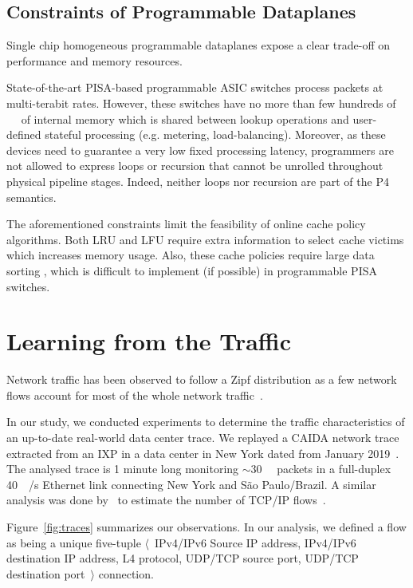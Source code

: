 \subsection{Constraints of Programmable Dataplanes}

Single chip homogeneous programmable dataplanes expose a clear trade-off on performance and memory resources.

State-of-the-art PISA-based programmable ASIC switches process packets at multi-terabit rates.
However, these switches have no more than few hundreds of \SI{}{\mega\byte} of internal memory which is shared between lookup operations and user-defined stateful processing (e.g. metering, load-balancing).
Moreover, as these devices need to guarantee a very low fixed processing latency, programmers are not allowed to express loops or recursion that cannot be unrolled throughout physical pipeline stages.
Indeed, neither loops nor recursion are part of the P4 semantics.

The aforementioned constraints limit the feasibility of online cache policy algorithms.
Both LRU and LFU require extra information to select cache victims which increases memory usage.
Also, these cache policies require large data sorting , which is difficult to implement (if possible) in programmable PISA switches.

\section{Learning from the Traffic}\label{sec:traffic}

Network traffic has been observed to follow a Zipf distribution as a few network flows account for most of the whole network traffic~\cite{Sarrar:2012,Jin:2017}.

In our study, we conducted experiments to determine the traffic characteristics of an up-to-date real-world data center trace.
We replayed a CAIDA network trace extracted from an IXP in a data center in New York dated from January 2019~\cite{caida:19}.
The analysed trace is 1 minute long monitoring $\sim$\SI{30}{\mega\nothing} packets in a full-duplex \SI{40}{\giga\bit/\second} Ethernet link connecting New York and S\~ao Paulo/Brazil.
A similar analysis was done by~\citeauthor{Spang:19} to estimate the number of TCP/IP flows~\cite{Spang:19}.

Figure~\ref{fig:traces} summarizes our observations.
In our analysis, we defined a flow as being a unique five-tuple $\langle$~IPv4/IPv6 Source IP address, IPv4/IPv6 destination IP address, L4 protocol, UDP/TCP source port, UDP/TCP destination port~$\rangle$ connection.

